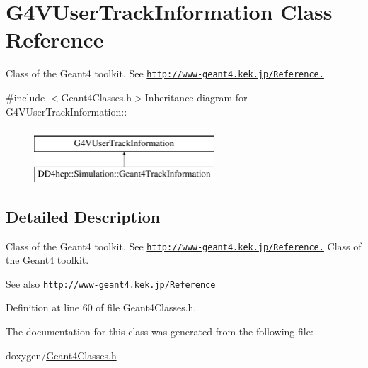 \hypertarget{class_g4_v_user_track_information}{
\section{G4VUserTrackInformation Class Reference}
\label{class_g4_v_user_track_information}
}


Class of the Geant4 toolkit. See \href{http://www-geant4.kek.jp/Reference.}{\tt http://www-\/geant4.kek.jp/Reference.}  


{\ttfamily \#include $<$Geant4Classes.h$>$}Inheritance diagram for G4VUserTrackInformation::\begin{figure}[H]
\begin{center}
\leavevmode
\includegraphics[height=2cm]{class_g4_v_user_track_information}
\end{center}
\end{figure}


\subsection{Detailed Description}
Class of the Geant4 toolkit. See \href{http://www-geant4.kek.jp/Reference.}{\tt http://www-\/geant4.kek.jp/Reference.} Class of the Geant4 toolkit. \begin{DoxySeeAlso}{See also}
\href{http://www-geant4.kek.jp/Reference}{\tt http://www-\/geant4.kek.jp/Reference} 
\end{DoxySeeAlso}


Definition at line 60 of file Geant4Classes.h.

The documentation for this class was generated from the following file:\begin{DoxyCompactItemize}
\item 
doxygen/\hyperlink{_geant4_classes_8h}{Geant4Classes.h}\end{DoxyCompactItemize}
